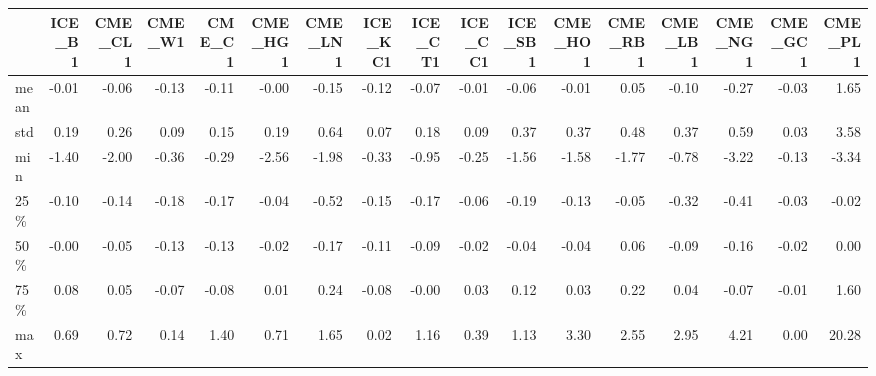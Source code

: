 \begin{tabular}{lrrrrrrrrrrrrrrrr}
\toprule
{} &  ICE\_B1 &  CME\_CL1 &  CME\_W1 &  CME\_C1 &  CME\_HG1 &  CME\_LN1 &  ICE\_KC1 &  ICE\_CT1 &  ICE\_CC1 &  ICE\_SB1 &  CME\_HO1 &  CME\_RB1 &  CME\_LB1 &  CME\_NG1 &  CME\_GC1 &  CME\_PL1 \\
\midrule
mean &   -0.01 &    -0.06 &   -0.13 &   -0.11 &    -0.00 &    -0.15 &    -0.12 &    -0.07 &    -0.01 &    -0.06 &    -0.01 &     0.05 &    -0.10 &    -0.27 &    -0.03 &     1.65 \\
std  &    0.19 &     0.26 &    0.09 &    0.15 &     0.19 &     0.64 &     0.07 &     0.18 &     0.09 &     0.37 &     0.37 &     0.48 &     0.37 &     0.59 &     0.03 &     3.58 \\
min  &   -1.40 &    -2.00 &   -0.36 &   -0.29 &    -2.56 &    -1.98 &    -0.33 &    -0.95 &    -0.25 &    -1.56 &    -1.58 &    -1.77 &    -0.78 &    -3.22 &    -0.13 &    -3.34 \\
25\%  &   -0.10 &    -0.14 &   -0.18 &   -0.17 &    -0.04 &    -0.52 &    -0.15 &    -0.17 &    -0.06 &    -0.19 &    -0.13 &    -0.05 &    -0.32 &    -0.41 &    -0.03 &    -0.02 \\
50\%  &   -0.00 &    -0.05 &   -0.13 &   -0.13 &    -0.02 &    -0.17 &    -0.11 &    -0.09 &    -0.02 &    -0.04 &    -0.04 &     0.06 &    -0.09 &    -0.16 &    -0.02 &     0.00 \\
75\%  &    0.08 &     0.05 &   -0.07 &   -0.08 &     0.01 &     0.24 &    -0.08 &    -0.00 &     0.03 &     0.12 &     0.03 &     0.22 &     0.04 &    -0.07 &    -0.01 &     1.60 \\
max  &    0.69 &     0.72 &    0.14 &    1.40 &     0.71 &     1.65 &     0.02 &     1.16 &     0.39 &     1.13 &     3.30 &     2.55 &     2.95 &     4.21 &     0.00 &    20.28 \\
\bottomrule
\end{tabular}
